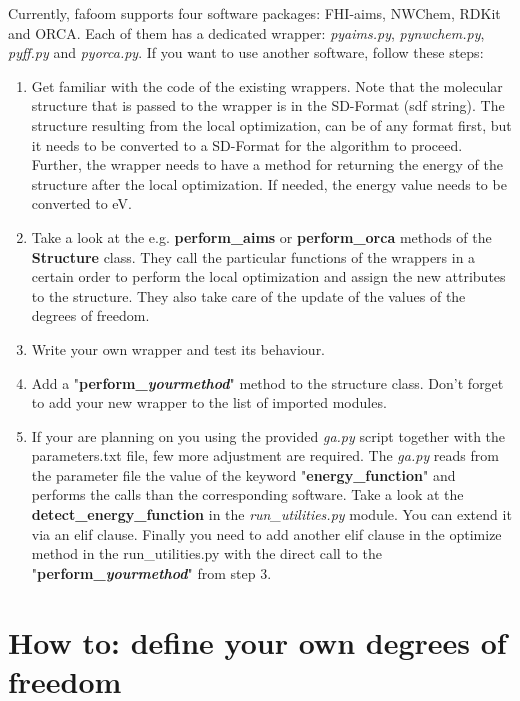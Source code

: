 \documentclass[a4paper]{article}
\begin{document}
Currently, fafoom supports four software packages: FHI-aims, NWChem, RDKit and ORCA. Each of them has a dedicated wrapper: \textit{pyaims.py}, \textit{pynwchem.py}, \textit{pyff.py} and  \textit{pyorca.py}. If you want to use another software, follow these steps:
\begin{enumerate}
\item Get familiar with the code of the existing wrappers. Note that the molecular structure that is passed to the wrapper is in the SD-Format (sdf string). The structure resulting from the local optimization, can be of any format first, but it needs to be converted to a SD-Format for the algorithm to proceed. Further, the wrapper needs to have a method for returning the energy of the structure after the local optimization. If needed, the energy value needs to be converted to eV. 
\item Take a look at the e.g. \textbf{perform\_aims} or \textbf{perform\_orca} methods of the \textbf{Structure} class. They call the particular functions of the wrappers in a certain order to perform the local optimization and assign the new attributes to the structure. They also take care of the update of the values of the degrees of freedom. 
\item Write your own wrapper and test its behaviour. 
\item Add a "\textbf{perform\_\textit{yourmethod}}" method to the structure class. Don't forget to add your new wrapper to the list of imported modules.
\item If your are planning on you using the provided \textit{ga.py} script together with the parameters.txt file, few more adjustment are required. The \textit{ga.py} reads from the parameter file the value of the keyword "\textbf{energy\_function}" and performs the calls than the corresponding software. Take a look at the \textbf{detect\_energy\_function} in the \textit{run\_utilities.py} module. You can extend it via an elif clause. Finally you need to add another elif clause in the optimize method in the run\_utilities.py with the direct call to the  "\textbf{perform\_\textit{yourmethod}}" from step 3. 

\end{enumerate}
  
\section{How to: define your own degrees of freedom}
\end{document}
